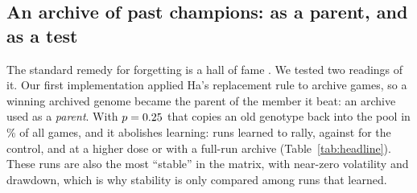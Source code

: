 \documentclass[11pt]{article}
\begin{document}
\subsection{An archive of past champions: as a parent, and as a test}
\label{sec:archive}

The standard remedy for forgetting is a hall of fame \citep{rosin1997new}. We
tested two readings of it. Our first implementation applied Ha's replacement
rule to archive games, so a winning archived genome became the parent of the
member it beat: an archive used as a \emph{parent}. With $p=0.25$ that copies
an old genotype back into the pool in \nHofparentRegressPct\% of all games, and
it abolishes learning: \nHofparentReached{} runs learned to rally, against
\nCtrlReached{} for the control, and \nHofparentOtherReached{} at a higher dose
or with a full-run archive (Table~\ref{tab:headline}). These runs are also the
most ``stable'' in the matrix, with near-zero volatility and drawdown, which is
why stability is only compared among runs that learned.
\end{document}
